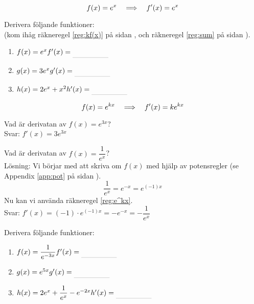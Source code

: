 \documentclass[a4paper, 12pt]{article}
\begin{document}
\begin{regel}
    \[f(x) = e^x \hspace{1em} \Longrightarrow \hspace{1em} f'(x) = e^x \]
\end{regel}

\begin{uppgifter} 
    \label{upp:e^x}
    Derivera följande funktioner: \\(kom ihåg räkneregel \ref*{reg:kf(x)} på sidan \pageref*{reg:kf(x)}, och räkneregel \ref*{reg:sum} på sidan \pageref*{reg:sum}).
    \begin{multicols}{3}
        \begin{enumerate}
            \item $f(x) = e^x \\ f'(x) \ans$
            \item $g(x) = 3e^x \\ g'(x) \ans$
            \item $h(x) = 2e^x + x^2 \\ h'(x) \ans$
        \end{enumerate}
    \end{multicols}
\end{uppgifter}


\begin{regel}
    \label{reg:e^kx}
    \[ f(x) = e^{kx} \hspace{1em} \Longrightarrow \hspace{1em} f'(x) = ke^{kx} \]
\end{regel}


\begin{exempel}
    Vad är derivatan av $f(x) = e^{3x}$? \\
    Svar: $f'(x) = 3e^{3x}$
\end{exempel}


\begin{exempel}
    Vad är derivatan av $f(x) = \dfrac 1{e^x}$? \\
    Lösning: Vi börjar med att skriva om $f(x)$ med hjälp av potensregler (se Appendix \ref*{app:pot} på sidan \pageref*{app:pot}). 
    \[ \frac 1{e^x} = e^{-x} = e^{(-1)x} \]
    Nu kan vi använda räkneregel \ref*{reg:e^kx}. \\
    Svar: $f'(x) = (-1)\cdot e^{(-1)x} = -e^{-x} = -\dfrac 1{e^x}$
\end{exempel}


\begin{uppgifter}
    \label{upp:e^kx}
    Derivera följande funktioner:
    \begin{multicols}{3}
        \begin{enumerate}
            \item $f(x) = \dfrac{1}{e^{-3x}} \\ f'(x) \ans$
            \item $g(x) = e^{5x} \\ g'(x) \ans$
            \item $h(x) = 2e^x + \dfrac 1{e^x} - e^{-2x} \\ h'(x) \ans$
        \end{enumerate}
    \end{multicols}
\end{uppgifter}
\end{document}
